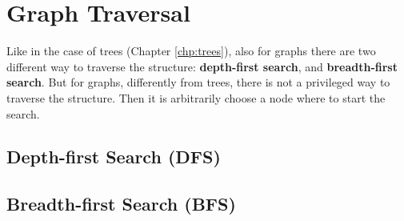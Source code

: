 \section{Graph Traversal}
Like in the case of trees (Chapter \ref{chp:trees}), also for graphs there are two different way to traverse the structure: \textbf{depth-first search}, and \textbf{breadth-first search}. But for graphs, differently from trees, there is not a privileged way to traverse the structure. Then it is arbitrarily choose a node where to start the search.

\subsection{Depth-first Search (DFS)}

\subsection{Breadth-first Search (BFS)}